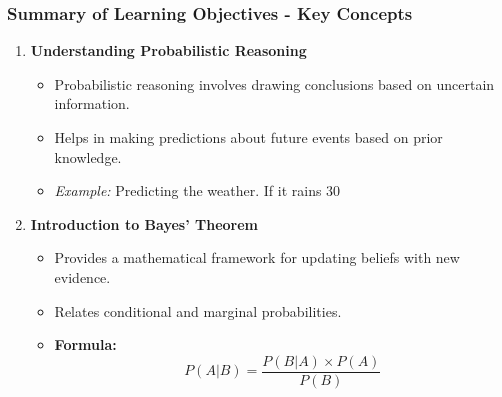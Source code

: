 \documentclass[aspectratio=169]{beamer}
\begin{document}
\begin{frame}[fragile]
    \frametitle{Summary of Learning Objectives - Key Concepts}
    \begin{enumerate}
        \item \textbf{Understanding Probabilistic Reasoning}
        \begin{itemize}
            \item Probabilistic reasoning involves drawing conclusions based on uncertain information.
            \item Helps in making predictions about future events based on prior knowledge.
            \item \textit{Example:} Predicting the weather. If it rains 30%
        \end{itemize}
        
        \item \textbf{Introduction to Bayes' Theorem}
        \begin{itemize}
            \item Provides a mathematical framework for updating beliefs with new evidence.
            \item Relates conditional and marginal probabilities.
            \item \textbf{Formula:} 
            \begin{equation}
            P(A|B) = \frac{P(B|A) \times P(A)}{P(B)}
            \end{equation}
        \end{itemize}
    \end{enumerate}
\end{frame}
\end{document}
